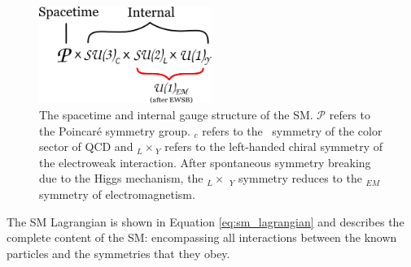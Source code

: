 \begin{figure}[!htb]
	\begin{center}
		\includegraphics[width=0.5\textwidth]{figures/chapter1/sm_forces}
		\caption{
			The spacetime and internal gauge structure of the SM.
			$\mathcal{P}$ refers to the Poincar{\'e} symmetry group.
			\SUthree$_c$ refers to the \SUthree~symmetry
			of the color sector of QCD and \SUtwo$_{L}\times$\Uone$_{Y}$ refers to the left-handed chiral
			symmetry of the electroweak interaction. After spontaneous symmetry
			breaking due to the Higgs mechanism, the \SUtwo$_L \times$ \Uone$_Y$ symmetry
			reduces to the \Uone$_{EM}$ symmetry of electromagnetism. 
		}
		\label{fig:sm_forces}
	\end{center}
\end{figure}
\FloatBarrier

The SM Lagrangian is shown in Equation \ref{eq:sm_lagrangian} and describes the complete
content of the SM: encompassing all interactions between the known particles and the
symmetries that they obey.

